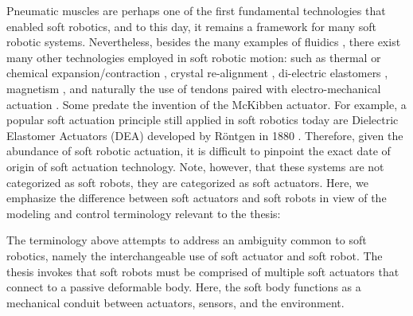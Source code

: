 Pneumatic muscles are perhaps one of the first fundamental technologies that enabled soft robotics, and to this day, it remains a framework for many soft robotic systems. Nevertheless, besides the many examples of fluidics \cite{Marchese2014,Marchese2016,Katzschmann2018,Suzumori1991,Mosadegh2014}, there exist many other technologies employed in soft robotic motion: such as thermal \cite{Wu2021Dec} or chemical expansion/contraction \cite{Tolley2014,Bartlett2015,Wehner2016}, crystal re-alignment \cite{Pilz2020,Lopez2018,Vantomme2021,Polygerinos2013}, di-electric elastomers \cite{Keplinger2011}, magnetism \cite{Roh2019Apr,KimYoonho2018,McDonald2020,Boyvat2017Jul}, and naturally the use of tendons paired with electro-mechanical actuation \cite{Renda2018,Bern2019,Kim2020Jun,Coevoet2017Feb,Wang2016Sep}. Some predate the invention of the McKibben actuator. For example, a popular soft actuation principle still applied in soft robotics today are Dielectric Elastomer Actuators (DEA) developed by R\"{o}ntgen in 1880 \cite{Rontgen1880}. Therefore, given the abundance of soft robotic actuation, it is difficult to pinpoint the exact date of origin of soft actuation technology. Note, however, that these systems are not categorized as soft robots, they are categorized as soft actuators. Here, we emphasize the difference between soft actuators and soft robots in view of the modeling and control terminology relevant to the thesis:

%
\begin{rmk} The terminology above attempts to address an ambiguity common to soft robotics, namely the interchangeable use of soft actuator and soft robot. The thesis invokes that soft robots must be comprised of multiple soft actuators that connect to a passive deformable body. Here, the soft body functions as a mechanical conduit between actuators, sensors, and the environment.
\end{rmk}


